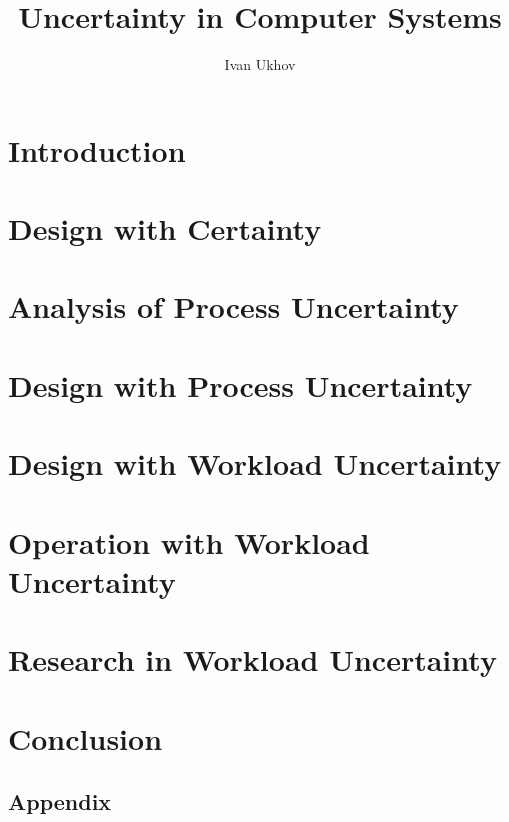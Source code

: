 \documentclass{thesis}
\title{Uncertainty in Computer Systems}
\author{Ivan Ukhov}
\begin{document}
\nocite{ukhov2012, ukhov2014a, ukhov2014b, ukhov2015, ukhov2017}

\chapter{Introduction}
\newcommand{\inputsection}{}


\chapter{Design with Certainty}
\renewcommand{\inputsection}[1]{}


\chapter{Analysis of Process Uncertainty}
\renewcommand{\inputsection}[1]{}


\chapter{Design with Process Uncertainty}
\renewcommand{\inputsection}[1]{}


\chapter{Design with Workload Uncertainty}
\renewcommand{\inputsection}[1]{}


\chapter{Operation with Workload Uncertainty}
\renewcommand{\inputsection}[1]{}


\chapter{Research in Workload Uncertainty}
\renewcommand{\inputsection}[1]{}


\chapter{Conclusion}


\begin{appendices}
\chapter{Appendix}
\renewcommand{\inputsection}[1]{}

\end{appendices}

\printbibliography
\end{document}
